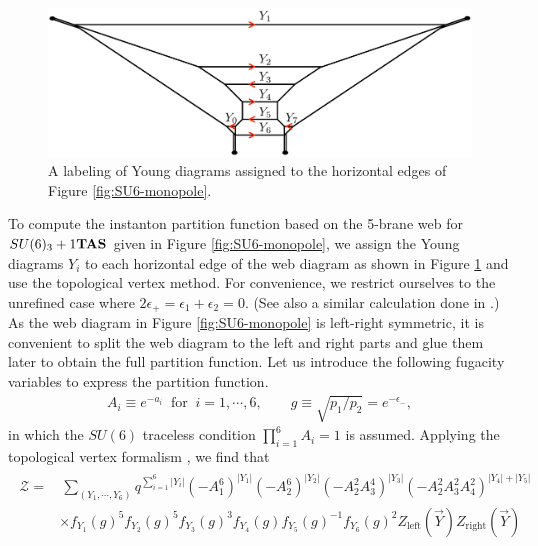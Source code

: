 \documentclass[letterpaper, 11pt]{article}
\begin{document}
{%
\begin{figure}[t]
\centering
\includegraphics[width=12cm]{SU6young.pdf}
\caption{A labeling of Young diagrams assigned to the horizontal edges of Figure \ref{fig:SU6-monopole}.}
\label{fig:SU6young}
\end{figure}
To compute the instanton partition function based on the 5-brane web for $SU(6)_3+1{\bf TAS}$ given in Figure \ref{fig:SU6-monopole}, we assign the Young diagrams $Y_i$ to each horizontal edge of the web diagram as shown in Figure \ref{fig:SU6young} and use the topological vertex method. For convenience, we restrict ourselves to the unrefined case where $2\epsilon_+=\epsilon_1+\epsilon_2=0$. (See also a similar calculation done in \cite{Hayashi:2019yxj}.) As the web diagram in Figure \ref{fig:SU6-monopole} is left-right symmetric, it is convenient to split the web diagram to the left and right parts and glue them later to obtain the full partition function. Let us introduce the following fugacity variables to express the partition function.
\begin{align}
A_i \equiv e^{-a_i} \ \text{ for } \ i=1, \cdots, 6
, \qquad g\equiv \sqrt{p_1/p_2} = e^{-\epsilon_-},
\end{align}
in which the $SU(6)$ traceless condition $\prod_{i=1}^{6}A_i =1$ is assumed. Applying the topological vertex formalism \cite{Aganagic:2003db}, we find that 
\begin{align}
  \label{eq:znek-su6}
  \begin{split}
  \mathcal{Z} 
  =&\, \sum_{(Y_1, \cdots, Y_6)}q^{\sum_{i=1}^6|Y_i|} (-A_1^6)^{|Y_1|}(-A_2^6)^{|Y_2|}(-A_2^2A_3^4)^{|Y_3|}(-A_2^2A_3^2A_4^2)^{|Y_4| + |Y_5|}\\
  &\times f_{Y_1}(g)^5f_{Y_2}(g)^5f_{Y_3}(g)^3f_{Y_4}(g)f_{Y_5}(g)^{-1}f_{Y_6}(g)^{2}
  Z_{\text{left}}(\vec{Y})Z_{\text{right}}(\vec{Y})
 \end{split}

\end{align}}
\end{document}
